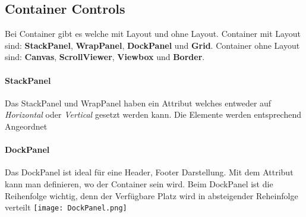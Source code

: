 \subsection{Container Controls} Bei Container gibt es welche mit Layout und ohne Layout. Container mit Layout sind: \textbf{StackPanel}, \textbf{WrapPanel}, \textbf{DockPanel} und \textbf{Grid}. Container ohne Layout sind: \textbf{Canvas}, \textbf{ScrollViewer}, \textbf{Viewbox} und \textbf{Border}.
\paragraph{StackPanel}Das StackPanel und WrapPanel haben ein Attribut  welches entweder auf \textit{Horizontal} oder \textit{Vertical} gesetzt werden kann. Die Elemente werden entsprechend Angeordnet
\paragraph{DockPanel}Das DockPanel ist ideal für eine Header, Footer Darstellung.
Mit dem Attribut  kann man definieren, wo der Container sein wird. Beim DockPanel ist die Reihenfolge wichtig, denn der Verfügbare Platz wird in absteigender Reheinfolge verteilt
\texttt{[image: DockPanel.png]}
